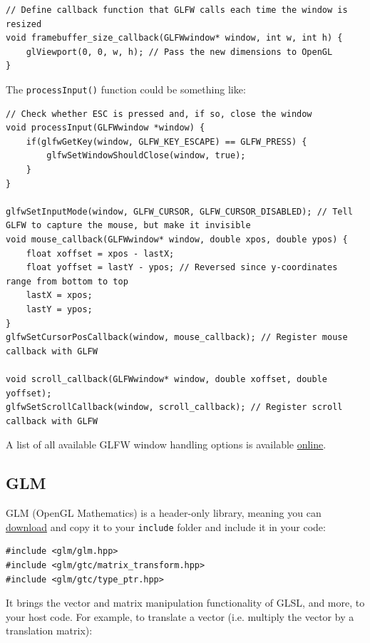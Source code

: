 \documentclass[table, xcdraw]{article}%
\begin{document}
\begin{verbatim}
// Define callback function that GLFW calls each time the window is resized
void framebuffer_size_callback(GLFWwindow* window, int w, int h) {
    glViewport(0, 0, w, h); // Pass the new dimensions to OpenGL
}
\end{verbatim}

The \texttt{processInput()} function could be something like:

\begin{verbatim}
// Check whether ESC is pressed and, if so, close the window
void processInput(GLFWwindow *window) {
    if(glfwGetKey(window, GLFW_KEY_ESCAPE) == GLFW_PRESS) {
        glfwSetWindowShouldClose(window, true);
    }
}

glfwSetInputMode(window, GLFW_CURSOR, GLFW_CURSOR_DISABLED); // Tell GLFW to capture the mouse, but make it invisible
void mouse_callback(GLFWwindow* window, double xpos, double ypos) {
    float xoffset = xpos - lastX;
    float yoffset = lastY - ypos; // Reversed since y-coordinates range from bottom to top
    lastX = xpos;
    lastY = ypos;
}
glfwSetCursorPosCallback(window, mouse_callback); // Register mouse callback with GLFW

void scroll_callback(GLFWwindow* window, double xoffset, double yoffset);
glfwSetScrollCallback(window, scroll_callback); // Register scroll callback with GLFW
\end{verbatim}

A list of all available GLFW window handling options is available \href{https://www.glfw.org/docs/latest/window.html#window_hints}{online}.

\subsection{GLM} \label{GLM}

GLM (OpenGL Mathematics) is a header-only library, meaning you can \href{https://glm.g-truc.net/0.9.8/index.html}{download} and copy it to your \texttt{include} folder and include it in your code:

\begin{verbatim}
#include <glm/glm.hpp>
#include <glm/gtc/matrix_transform.hpp>
#include <glm/gtc/type_ptr.hpp>
\end{verbatim}

It brings the vector and matrix manipulation functionality of GLSL, and more, to your host code. For example, to translate a vector (i.e. multiply the vector by a translation matrix):
\end{document}
